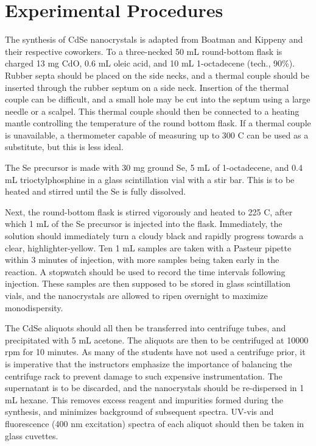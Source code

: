 \documentclass[journal = jceda8, manuscript = article]{achemso}
\begin{document}
\section{Experimental Procedures}


The synthesis of CdSe nanocrystals is adapted from Boatman and Kippeny and their
respective coworkers. \cite{jce-1, jce-2} To a three-necked 50 mL round-bottom
flask is charged 13 mg CdO, 0.6 mL oleic acid, and 10 mL 1-octadecene (tech.,
90\%). Rubber septa should be placed on the side necks, and a thermal couple
should be inserted through the rubber septum on a side neck. Insertion of the
thermal couple can be difficult, and a small hole may be cut into the septum
using a large needle or a scalpel. This thermal couple should then be connected
to a heating mantle controlling the temperature of the round bottom flask.  If a
thermal couple is unavailable, a thermometer capable of measuring up to 300
\degree C can be used as a substitute, but this is less ideal.

The Se precursor is made with 30 mg ground Se, 5 mL of 1-octadecene, and
0.4 mL trioctylphosphine in a glass scintillation vial with a stir bar. This is
to be heated and stirred until the Se is fully dissolved.

Next, the round-bottom flask is stirred vigorously and heated to 225 \degree C,
after which 1 mL of the Se precursor is injected into the flask. Immediately,
the solution should immediately turn a cloudy black and rapidly progress towards
a clear, highlighter-yellow. Ten 1 mL samples are taken with a Pasteur pipette
within 3 minutes of injection, with more samples being taken early in the
reaction. A stopwatch should be used to record the time intervals following
injection. These samples are then supposed to be stored in glass scintillation
vials, and the nanocrystals are allowed to ripen overnight to maximize
monodispersity. \cite{ostwald}

The CdSe aliquots should all then be transferred into centrifuge tubes, and
precipitated with 5 mL acetone. The aliquots are then to be centrifuged at 10000
rpm for 10 minutes. As many of the students have not used a centrifuge prior, it
is imperative that the instructors emphasize the importance of balancing the
centrifuge rack to prevent damage to such expensive instrumentation. The
supernatant is to be discarded, and the nanocrystals should be re-dispersed in
1 mL hexane. This removes excess reagent and impurities formed during the
  synthesis, and minimizes background of subsequent spectra. UV-vis and
  fluorescence (400 nm excitation) spectra of each aliquot should then be taken
  in glass cuvettes.
\end{document}
